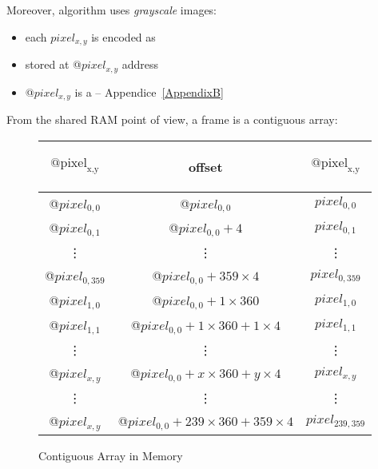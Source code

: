 Moreover, \flow{} algorithm uses \emph{grayscale} images:

\begin{itemize}
	\item each $pixel_{x,y}$ is encoded as 
	\item stored at @$pixel_{x,y}$ address
	\item @$pixel_{x,y}$ is a  -- Appendice~\ref{AppendixB}
\end{itemize}


From the shared RAM point of view, a frame is a contiguous array:
\begin{figure}[h]
\begin{center}
\begin{tabular}{|c|c|c|}

	\hline
	\begin{bf}$\text{@pixel}_\text{{x,y}}$\end{bf} & \begin{bf}offset\end{bf} & \begin{bf}$\text{@pixel}_\text{{x,y}}$\end{bf} \\[10pt]

	\hline
	@$pixel_{0,0}$ & @$pixel_{0,0}$ & $pixel_{0,0}$ \\

	\hline
	@$pixel_{0,1}$ & @$pixel_{0,0} + 4$ & $pixel_{0,1}$ \\

	\hline
	\vdots & \vdots & \vdots \\

	\hline
	@$pixel_{0,359}$ & @$pixel_{0,0} + 359\times 4$ & $pixel_{0,359}$ \\

	\hline
	@$pixel_{1,0}$ & @$pixel_{0,0} + 1\times 360$ & $pixel_{1,0}$ \\

	\hline
	@$pixel_{1,1}$ & @$pixel_{0,0} + 1\times 360 + 1\times 4$ & $pixel_{1,1}$ \\

	\hline
	\vdots & \vdots & \vdots \\

	\hline
	\rowcolor{yellow}@$pixel_{x,y}$ & @$pixel_{0,0} + x\times 360 + y\times 4$ & $pixel_{x,y}$ \\

	\hline
	\vdots & \vdots & \vdots \\

	\hline
	@$pixel_{x,y}$ & @$pixel_{0,0} + 239\times 360 + 359\times 4$ & $pixel_{239,359}$ \\

	\hline

\end{tabular}
\end{center}
\caption{Contiguous Array in Memory}
\end{figure}
\FloatBarrier

